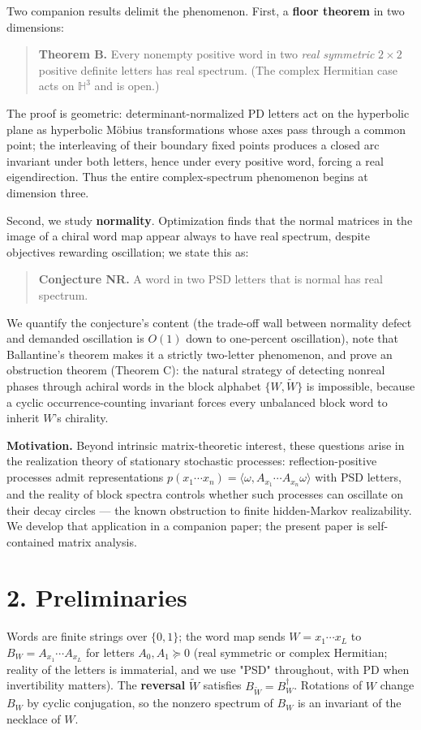 \documentclass[11pt]{article}
\begin{document}
Two companion results delimit the phenomenon.  First, a \textbf{floor theorem} in two dimensions:

\begin{quote}
\textbf{Theorem B.}  Every nonempty positive word in two \emph{real symmetric} $2\times 2$ positive definite letters has real spectrum.  (The complex Hermitian case acts on $\mathbb H^3$ and is open.)
\end{quote}
The proof is geometric: determinant-normalized PD letters act on the hyperbolic plane as hyperbolic Möbius transformations whose axes pass through a common point; the interleaving of their boundary fixed points produces a closed arc invariant under both letters, hence under every positive word, forcing a real eigendirection.  Thus the entire complex-spectrum phenomenon begins at dimension three.

Second, we study \textbf{normality}.  Optimization finds that the normal matrices in the image of a chiral word map appear always to have real spectrum, despite objectives rewarding oscillation; we state this as:

\begin{quote}
\textbf{Conjecture NR.}  A word in two PSD letters that is normal has real spectrum.
\end{quote}
We quantify the conjecture's content (the trade-off wall between normality defect and demanded oscillation is $O(1)$ down to one-percent oscillation), note that Ballantine's theorem makes it a strictly two-letter phenomenon, and prove an obstruction theorem (Theorem C): the natural strategy of detecting nonreal phases through achiral words in the block alphabet $\{W, \widetilde W\}$ is impossible, because a cyclic occurrence-counting invariant forces every unbalanced block word to inherit $W$'s chirality.

\textbf{Motivation.}  Beyond intrinsic matrix-theoretic interest, these questions arise in the realization theory of stationary stochastic processes: reflection-positive processes admit representations $p(x_1\cdots x_n) = \langle \omega, A_{x_1}\cdots A_{x_n}\omega\rangle$ with PSD letters, and the reality of block spectra controls whether such processes can oscillate on their decay circles — the known obstruction to finite hidden-Markov realizability.  We develop that application in a companion paper; the present paper is self-contained matrix analysis.

\section*{2. Preliminaries}
Words are finite strings over $\{0, 1\}$; the word map sends $W = x_1\cdots x_L$ to $B_W = A_{x_1}\cdots A_{x_L}$ for letters $A_0, A_1 \succeq 0$ (real symmetric or complex Hermitian; reality of the letters is immaterial, and we use "PSD" throughout, with PD when invertibility matters).  The \textbf{reversal} $\widetilde W$ satisfies $B_{\widetilde W} = B_W^{\dagger}$.  Rotations of $W$ change $B_W$ by cyclic conjugation, so the nonzero spectrum of $B_W$ is an invariant of the necklace of $W$.
\end{document}
